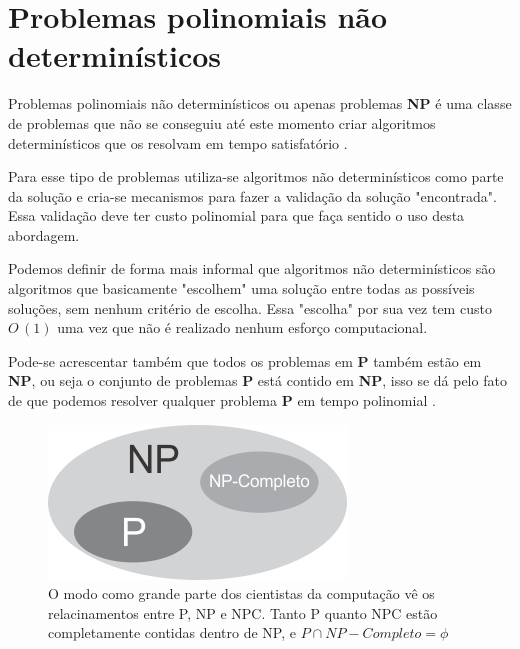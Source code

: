 \section{Problemas polinomiais não determinísticos}
Problemas polinomiais não determinísticos ou apenas problemas \textbf{NP} é uma classe de problemas que não se conseguiu até este momento criar algoritmos determinísticos que os resolvam em tempo satisfatório \cite{goodrichprojeto}. 

Para esse tipo de problemas utiliza-se algoritmos não determinísticos como parte da solução e cria-se mecanismos para fazer a validação da solução "encontrada". Essa validação deve ter custo polinomial para que faça sentido o uso desta abordagem. 

Podemos definir de forma mais informal que algoritmos não determinísticos são algoritmos que basicamente "escolhem" uma solução entre todas as possíveis soluções, sem nenhum critério de escolha. Essa "escolha" por sua vez tem custo $O\,(1)$ uma vez que não é realizado nenhum esforço computacional.

Pode-se acrescentar também que todos os problemas em \textbf{P} também estão em \textbf{NP}, ou seja o conjunto de problemas \textbf{P} está contido em \textbf{NP}, isso se dá pelo fato de que podemos resolver qualquer problema \textbf{P} em tempo polinomial \cite{leisersonalgoritmos}.

\begin{figure}[H]
	\centering
	\label{fig1}
	\includegraphics[scale=2]{./figuras/figProblemas.png}
	\caption{O modo como grande parte dos cientistas da computação vê os relacinamentos entre P, NP e NPC. Tanto P quanto NPC estão completamente contidas dentro de NP, e $P \cap NP-Completo = \phi$ \cite{leisersonalgoritmos}}
\end{figure}
